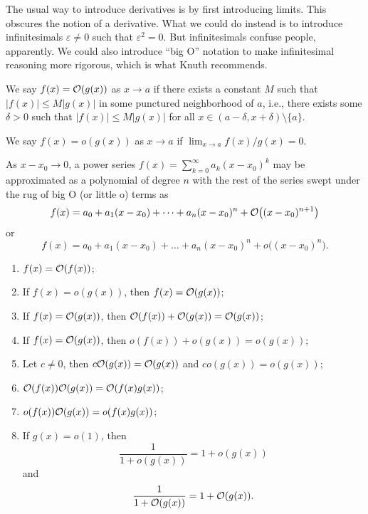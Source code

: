 \begin{node}\label{calculus-0005}%
\begin{node}\label{calculus-0002}%
The usual way to introduce derivatives is by first introducing
limits. This obscures the notion of a derivative. What we could do
instead is to introduce infinitesimals $\varepsilon\neq0$ such that
$\varepsilon^{2}=0$. But infinitesimals confuse people, apparently.
We could also introduce ``big O'' notation to make infinitesimal
reasoning more rigorous, which is what Knuth recommends.
\end{node}

\begin{definition}\label{calculus-0001}%
We say $f(x)=\mathcal{O}(g(x))$ as $x\to a$ if there exists a constant $M$
such that $|f(x)|\leq M|g(x)|$ in some punctured neighborhood of $a$,
i.e., there exists some $\delta>0$ such that $|f(x)|\leq M|g(x)|$ for all $x\in(a-\delta,x+\delta)\setminus\{a\}$.

We say $f(x)=o(g(x))$ as $x\to a$ if $\lim_{x\to a}f(x)/g(x)=0$.
\end{definition}

\begin{example}
As $x-x_{0}\to 0$, a power series $f(x)=\sum^{\infty}_{k=0}a_{k}(x-x_{0})^{k}$
may be approximated as a polynomial of degree $n$ with the rest of the
series swept under the rug of big O (or little o) terms as
\[f(x) = a_{0} + a_{1}(x-x_{0}) + \dots + a_{n}(x-x_{0})^{n} + \mathcal{O}\bigl((x-x_{0})^{n+1}\bigr)\]
or
\[f(x) = a_{0} + a_{1}(x-x_{0}) + \dots + a_{n}(x-x_{0})^{n} + o\bigl((x-x_{0})^{n}\bigr).\]
\end{example}

\begin{theorem}\label{calculus-0004}%
\begin{enumerate}
\item $f(x)=\mathcal{O}(f(x))$;
\item If $f(x)=o(g(x))$, then $f(x)=\mathcal{O}(g(x))$;
\item If $f(x)=\mathcal{O}(g(x))$, then $\mathcal{O}(f(x))+\mathcal{O}(g(x))=\mathcal{O}(g(x))$;
\item If $f(x)=\mathcal{O}(g(x))$, then $o(f(x))+o(g(x))=o(g(x))$;
\item Let $c\neq0$, then $c\mathcal{O}(g(x))=\mathcal{O}(g(x))$ and $co(g(x))=o(g(x))$;
\item $\mathcal{O}(f(x))\mathcal{O}(g(x))=\mathcal{O}(f(x)g(x))$;
\item $o(f(x))\mathcal{O}(g(x))=o(f(x)g(x))$;
\item If $g(x)=o(1)$, then
  \[\frac{1}{1+o(g(x))}=1+o(g(x))\]
  and
  \[\frac{1}{1+\mathcal{O}(g(x))}=1+\mathcal{O}(g(x)).\]
\end{enumerate}
\end{theorem}


\end{node}
